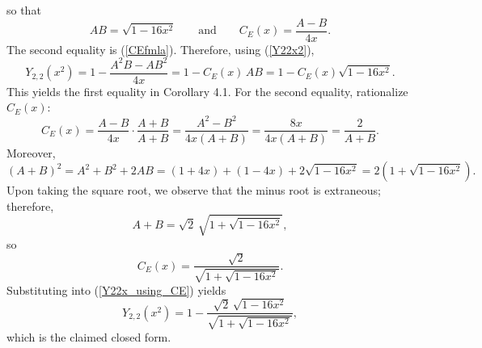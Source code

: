 \documentclass[10pt]{article}
\newcommand{\eqn}[1]{\begin{equation*} #1 \end{equation*}}
\newcommand{\neqn}[1]{\begin{equation} #1 \end{equation}}
\newcommand{\qquadtext}[1]{\qquad \text{#1} \qquad}
\begin{document}
so that
\eqn{AB = \sqrt{1-16x^2} \qquadtext{and} C_E(x)=\frac{A-B}{4x}.}
The second equality is (\ref{CEfmla}). Therefore, using (\ref{Y22x2}),
\neqn{Y_{2,2}(x^2) = 1-\frac{A^2B-AB^2}{4x} = 1-C_E(x)\,AB = 1-C_E(x)\sqrt{1-16x^2}. \label{Y22x_using_CE}}
This yields the first equality in Corollary 4.1.  For the second equality, rationalize $C_E(x)$:
\eqn{
C_E(x) = \frac{A-B}{4x} \cdot \frac{A+B}{A+B} = \frac{A^2-B^2}{4x(A+B)} = \frac{8x}{4x(A+B)} = \frac{2}{A+B}.}
Moreover,
\eqn{(A+B)^2 = A^2 + B^2 + 2AB = (1+4x) + (1-4x) + 2\sqrt{1-16x^2} = 2 \left(1 + \sqrt{1-16x^2} \right).}
Upon taking the square root, we observe that the minus root is extraneous; therefore,
\eqn{A+B = \sqrt{2} \, \sqrt{1+\sqrt{1-16x^2}},}
so
\eqn{C_E(x) = \frac{\sqrt{2}}{\sqrt{1+\sqrt{1-16x^2}}}.}
Substituting into (\ref{Y22x_using_CE}) yields
\eqn{Y_{2,2}(x^2) = 1 - \frac{\sqrt{2}\,\sqrt{1-16x^2}}{\sqrt{1+\sqrt{1-16x^2}}},}
which is the claimed closed form.
\end{document}
